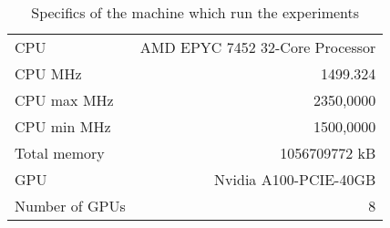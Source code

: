 \begin{table}[h]
\centering
\begin{tabular}{|l  |r|}
 \hline
CPU & AMD EPYC 7452 32-Core Processor\\
CPU MHz&                     1499.324\\
CPU max MHz&                     2350,0000\\
CPU min MHz&                     1500,0000\\
Total memory&       1056709772 kB\\
GPU&    Nvidia A100-PCIE-40GB\\
Number of GPUs & 8\\
\hline
\end{tabular}
\caption{Specifics of the machine which run the experiments}
\label{tab:gpu_info}
\end{table}






